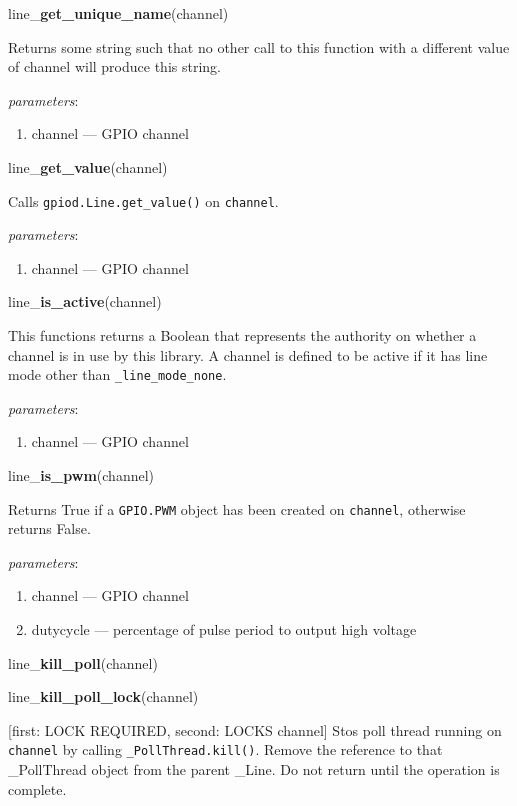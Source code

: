 \documentclass[12pt]{article}
\begin{document}
\noindent line\_\textbf{get\_unique\_name}(channel)

Returns some string such that no other call to this function with a different value of channel will produce this string.

\textit{parameters}:
\begin{enumerate}      
        \item channel --- GPIO channel
\end{enumerate}

\noindent line\_\textbf{get\_value}(channel)

Calls \texttt{gpiod.Line.get\_value()} on \texttt{channel}.

\textit{parameters}:
\begin{enumerate}      
        \item channel --- GPIO channel
\end{enumerate}


\noindent line\_\textbf{is\_active}(channel)

This functions returns a Boolean that represents the authority on whether a channel is in use by this library. A channel is defined to be active if it has line mode other than \texttt{\_line\_mode\_none}.

\textit{parameters}:
\begin{enumerate}      
        \item channel --- GPIO channel
\end{enumerate}

\noindent line\_\textbf{is\_pwm}(channel)

Returns True if a \texttt{GPIO.PWM} object has been created on \texttt{channel}, otherwise returns False.

\textit{parameters}:
\begin{enumerate}      
        \item channel --- GPIO channel
        \item dutycycle --- percentage of pulse period to output high voltage
\end{enumerate}

\noindent line\_\textbf{kill\_poll}(channel)

\noindent line\_\textbf{kill\_poll\_lock}(channel)

[first: LOCK REQUIRED, second: LOCKS channel]
Stos poll thread running on \texttt{channel} by calling \texttt{\_PollThread.kill()}. Remove the reference to that \_PollThread object from the parent \_Line. Do not return until the operation is complete.
\end{document}
